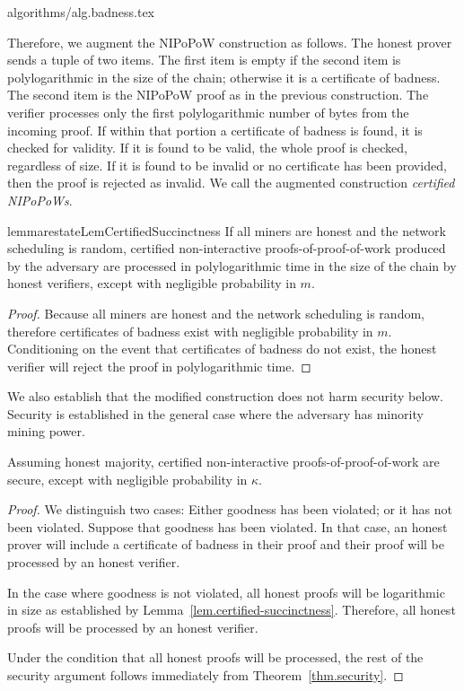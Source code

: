 {algorithms/alg.badness.tex}

Therefore, we augment the NIPoPoW construction as follows. The honest prover
sends a tuple of two items. The first item is empty if the second item is
polylogarithmic in the size of the chain; otherwise it is a certificate of
badness. The second item is the NIPoPoW proof as in the previous construction.
The verifier processes only the first polylogarithmic number of bytes from the
incoming proof. If within that portion a certificate of badness is found, it is
checked for validity. If it is found to be valid, the whole proof is checked,
regardless of size. If it is found to be invalid or no certificate has been
provided, then the proof is rejected as invalid. We call the augmented
construction \textit{certified NIPoPoWs}.

\begin{restatable}{lemma}{restateLemCertifiedSuccinctness}
    \label{lem.certified-succinctness}
    If all miners are honest and the network scheduling is random,
    certified non-interactive proofs-of-proof-of-work produced by the adversary
    are processed in polylogarithmic time in the size of the chain by honest
    verifiers, except with negligible probability in $m$.
\end{restatable}
\begin{proof}
    Because all miners are honest and the network scheduling is random,
    therefore certificates of badness exist with negligible probability in $m$.
    Conditioning on the event that certificates of badness do not exist, the
    honest verifier will reject the proof in polylogarithmic time.
    \Qed
\end{proof}

We also establish that the modified construction does not harm security below.
Security is established in the general case where the adversary has minority
mining power.

\begin{theorem}
    Assuming honest majority, certified non-interactive proofs-of-proof-of-work
    are secure, except with negligible probability in $\kappa$.
\end{theorem}
\begin{proof}
    We distinguish two cases: Either goodness has been violated; or it has not
    been violated. Suppose that goodness has been violated. In that case, an
    honest prover will include a certificate of badness in their proof and their
    proof will be processed by an honest verifier.

    In the case where goodness is not violated, all honest proofs will be
    logarithmic in size as established by
    Lemma~\ref{lem.certified-succinctness}. Therefore, all honest proofs will
    be processed by an honest verifier.

    Under the condition that all honest proofs will be processed, the rest of
    the security argument follows immediately from Theorem~\ref{thm.security}.
    \Qed
\end{proof}

